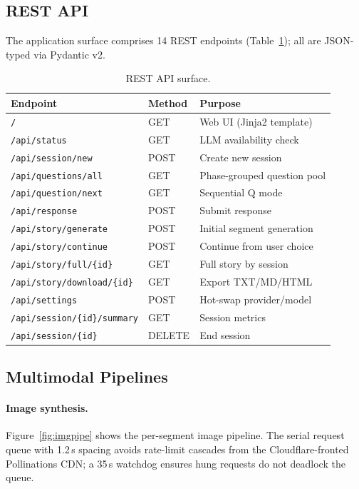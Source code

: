 \subsection{REST API}
The application surface comprises 14 REST endpoints
(Table~\ref{tab:rest}); all are JSON-typed via Pydantic v2.

\begin{table}[!t]
\caption{REST API surface.}
\label{tab:rest}
\centering
\renewcommand{\arraystretch}{1.15}
\small
\begin{tabular}{@{}lll@{}}
\toprule
\textbf{Endpoint}                    & \textbf{Method} & \textbf{Purpose} \\
\midrule
\texttt{/}                           & GET    & Web UI (Jinja2 template) \\
\texttt{/api/status}                 & GET    & LLM availability check \\
\texttt{/api/session/new}            & POST   & Create new session \\
\texttt{/api/questions/all}          & GET    & Phase-grouped question pool \\
\texttt{/api/question/next}          & GET    & Sequential Q mode \\
\texttt{/api/response}               & POST   & Submit response \\
\texttt{/api/story/generate}         & POST   & Initial segment generation \\
\texttt{/api/story/continue}         & POST   & Continue from user choice \\
\texttt{/api/story/full/\{id\}}      & GET    & Full story by session \\
\texttt{/api/story/download/\{id\}}  & GET    & Export TXT/MD/HTML \\
\texttt{/api/settings}               & POST   & Hot-swap provider/model \\
\texttt{/api/session/\{id\}/summary} & GET    & Session metrics \\
\texttt{/api/session/\{id\}}         & DELETE & End session \\
\bottomrule
\end{tabular}
\end{table}

\subsection{Multimodal Pipelines}

\paragraph{Image synthesis.}
Figure~\ref{fig:imgpipe} shows the per-segment image pipeline. The
serial request queue with 1.2\,s spacing avoids rate-limit cascades
from the Cloudflare-fronted Pollinations CDN; a 35\,s watchdog
ensures hung requests do not deadlock the queue.

